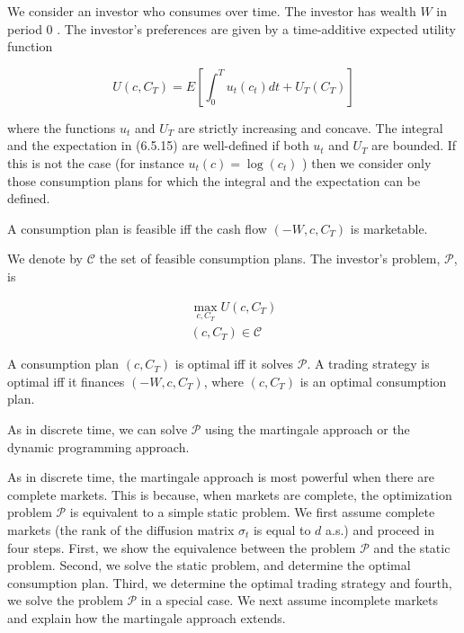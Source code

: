 \documentclass[\topdir/lecture\_notes.tex]{subfiles}
\begin{document}
We consider an investor who consumes over time. The investor has wealth \(W\) in period 0 . The investor's preferences are given by a time-additive expected utility function

\begin{equation}
U\left(c, C_{T}\right)=E\left[\int_{0}^{T} u_{t}\left(c_{t}\right) d t+U_{T}\left(C_{T}\right)\right] \label{eq:6.5.15}
\end{equation}

where the functions \(u_{t}\) and \(U_{T}\) are strictly increasing and concave. The integral and the expectation in (6.5.15) are well-defined if both \(u_{t}\) and \(U_{T}\) are bounded. If this is not the case (for instance \(u_{t}(c)=\log \left(c_{t}\right)\) ) then we consider only those consumption plans for which the integral and the expectation can be defined.

\begin{defn}\label{def:6.5.2}
A consumption plan is feasible iff the cash flow \(\left(-W, c, C_{T}\right)\) is marketable.
\end{defn}

We denote by \(\mathcal{C}\) the set of feasible consumption plans. The investor's problem, \(\mathcal{P}\), is

\begin{equation}
\begin{gathered}
\max _{c, C_{T}} U\left(c, C_{T}\right) \\
\left(c, C_{T}\right) \in \mathcal{C}
\end{gathered}
\end{equation}

\begin{defn}\label{def:6.5.3}
A consumption plan \(\left(c, C_{T}\right)\) is optimal iff it solves \(\mathcal{P}\). A trading strategy is optimal iff it finances \(\left(-W, c, C_{T}\right)\), where \(\left(c, C_{T}\right)\) is an optimal consumption plan.
\end{defn}

As in discrete time, we can solve \(\mathcal{P}\) using the martingale approach or the dynamic programming approach.

As in discrete time, the martingale approach is most powerful when there are complete markets. This is because, when markets are complete, the optimization problem \(\mathcal{P}\) is equivalent to a simple static problem. We first assume complete markets (the rank of the diffusion matrix \(\sigma_{t}\) is equal to \(d\) a.s.) and proceed in four steps. First, we show the equivalence between the problem \(\mathcal{P}\) and the static problem. Second, we solve the static problem, and determine the optimal consumption plan. Third, we determine the optimal trading strategy and fourth, we solve the problem \(\mathcal{P}\) in a special case. We next assume incomplete markets and explain how the martingale approach extends.
\end{document}
